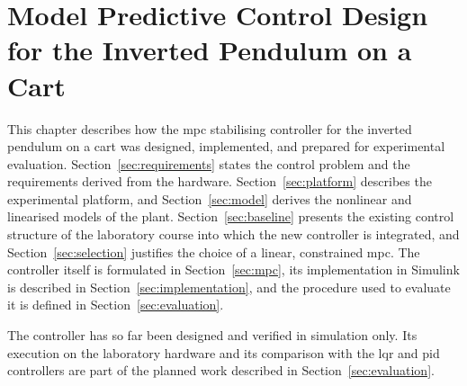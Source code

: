 
\providecommand{\placeholderfig}[5]{
    \begin{figure}[ht]
     \centering
      \fbox{\parbox[c][0.28\textheight][c]{#1\textwidth}{\centering
        \textbf{Figure placeholder}\\[2mm]
        \texttt{\detokenize{images/#2}}\\[2mm]
        \small #5}}
      \caption{#3}
      \label{#4}
    \end{figure}
}

\chapter{Model Predictive Control Design for the Inverted Pendulum on a Cart}
\label{chap:methodology}

This chapter describes how the \ac{mpc} stabilising
controller for the inverted pendulum on a cart was designed, implemented, and
prepared for experimental evaluation. Section~\ref{sec:requirements} states the
control problem and the requirements derived from the hardware.
Section~\ref{sec:platform} describes the experimental platform, and
Section~\ref{sec:model} derives the nonlinear and linearised models of the
plant. Section~\ref{sec:baseline} presents the existing control structure of
the laboratory course into which the new controller is integrated, and
Section~\ref{sec:selection} justifies the choice of a linear, constrained
\ac{mpc}. The controller itself is formulated in Section~\ref{sec:mpc}, its
implementation in Simulink is described in Section~\ref{sec:implementation},
and the procedure used to evaluate it is defined in
Section~\ref{sec:evaluation}.

The controller has so far been designed and verified in simulation only. Its
execution on the laboratory hardware and its comparison with the \ac{lqr} and \ac{pid} controllers are part of the planned work described in
Section~\ref{sec:evaluation}.

